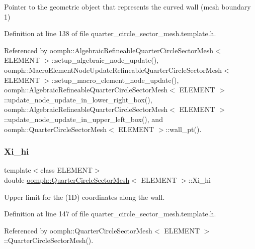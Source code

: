 Pointer to the geometric object that represents the curved wall (mesh boundary 1) 



Definition at line 138 of file quarter\+\_\+circle\+\_\+sector\+\_\+mesh.\+template.\+h.



Referenced by oomph\+::\+Algebraic\+Refineable\+Quarter\+Circle\+Sector\+Mesh$<$ E\+L\+E\+M\+E\+N\+T $>$\+::setup\+\_\+algebraic\+\_\+node\+\_\+update(), oomph\+::\+Macro\+Element\+Node\+Update\+Refineable\+Quarter\+Circle\+Sector\+Mesh$<$ E\+L\+E\+M\+E\+N\+T $>$\+::setup\+\_\+macro\+\_\+element\+\_\+node\+\_\+update(), oomph\+::\+Algebraic\+Refineable\+Quarter\+Circle\+Sector\+Mesh$<$ E\+L\+E\+M\+E\+N\+T $>$\+::update\+\_\+node\+\_\+update\+\_\+in\+\_\+lower\+\_\+right\+\_\+box(), oomph\+::\+Algebraic\+Refineable\+Quarter\+Circle\+Sector\+Mesh$<$ E\+L\+E\+M\+E\+N\+T $>$\+::update\+\_\+node\+\_\+update\+\_\+in\+\_\+upper\+\_\+left\+\_\+box(), and oomph\+::\+Quarter\+Circle\+Sector\+Mesh$<$ E\+L\+E\+M\+E\+N\+T $>$\+::wall\+\_\+pt().

\mbox{\label{classoomph_1_1QuarterCircleSectorMesh_a1fa3bfeddd4467e9fe0ec45fbfac0740}} 
\subsubsection{\texorpdfstring{Xi\+\_\+hi}{Xi\_hi}}
{\footnotesize\ttfamily template$<$class E\+L\+E\+M\+E\+NT$>$ \\
double \hyperlink{classoomph_1_1QuarterCircleSectorMesh}{oomph\+::\+Quarter\+Circle\+Sector\+Mesh}$<$ E\+L\+E\+M\+E\+NT $>$\+::Xi\+\_\+hi\hspace{0.3cm}{\ttfamily [protected]}}



Upper limit for the (1D) coordinates along the wall. 



Definition at line 147 of file quarter\+\_\+circle\+\_\+sector\+\_\+mesh.\+template.\+h.



Referenced by oomph\+::\+Quarter\+Circle\+Sector\+Mesh$<$ E\+L\+E\+M\+E\+N\+T $>$\+::\+Quarter\+Circle\+Sector\+Mesh().

